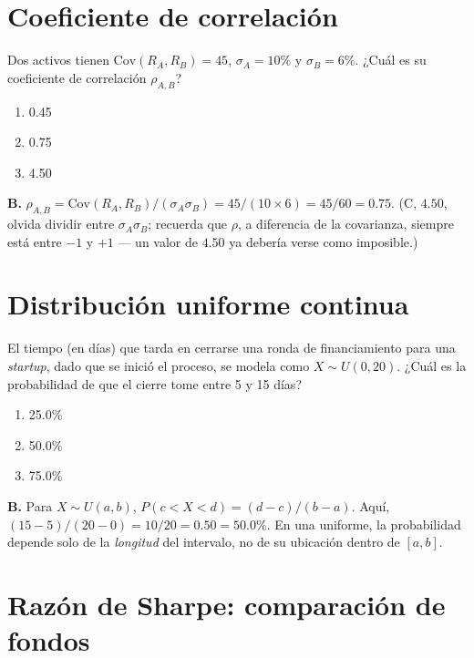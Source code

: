 \documentclass[11pt,a4paper,oneside]{article}
\theoremstyle{definition}
\begin{document}
\section{Coeficiente de correlación}

\begin{cfaBox}
Dos activos tienen $\mathrm{Cov}(R_A,R_B)=45$, $\sigma_A=10\%$ y
$\sigma_B=6\%$. ¿Cuál es su coeficiente de correlación $\rho_{A,B}$?
\begin{enumerate}[label=\Alph*.]
\item 0.45
\item 0.75
\item 4.50
\end{enumerate}
\end{cfaBox}
\begin{solBox}
\textbf{B.} $\rho_{A,B}=\mathrm{Cov}(R_A,R_B)/(\sigma_A\sigma_B)=45/(10\times6)=45/60=0.75$.
(C, $4.50$, olvida dividir entre $\sigma_A\sigma_B$; recuerda que $\rho$,
a diferencia de la covarianza, siempre está entre $-1$ y $+1$ --- un valor
de $4.50$ ya debería verse como imposible.)
\end{solBox}

\section{Distribución uniforme continua}

\begin{cfaBox}
El tiempo (en días) que tarda en cerrarse una ronda de financiamiento para
una \emph{startup}, dado que se inició el proceso, se modela como
$X\sim U(0,20)$. ¿Cuál es la probabilidad de que el cierre tome entre 5 y
15 días?
\begin{enumerate}[label=\Alph*.]
\item 25.0\%
\item 50.0\%
\item 75.0\%
\end{enumerate}
\end{cfaBox}
\begin{solBox}
\textbf{B.} Para $X\sim U(a,b)$, $P(c<X<d)=(d-c)/(b-a)$. Aquí,
$(15-5)/(20-0)=10/20=0.50=50.0\%$. En una uniforme, la probabilidad
depende solo de la \emph{longitud} del intervalo, no de su ubicación
dentro de $[a,b]$.
\end{solBox}

\section{Razón de Sharpe: comparación de fondos}
\end{document}
